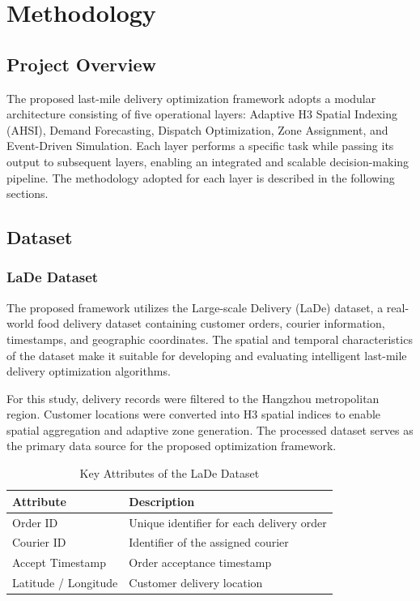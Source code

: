 \documentclass{article}
\begin{document}
\newpage
\section{Methodology}
\label{sec:methodology}

\subsection{Project Overview}
\label{subsec:project_overview}

The proposed last-mile delivery optimization framework adopts a modular architecture consisting of five operational layers: Adaptive H3 Spatial Indexing (AHSI), Demand Forecasting, Dispatch Optimization, Zone Assignment, and Event-Driven Simulation. Each layer performs a specific task while passing its output to subsequent layers, enabling an integrated and scalable decision-making pipeline. The methodology adopted for each layer is described in the following sections.

\subsection{Dataset}
\label{subsec:dataset}

\subsubsection{LaDe Dataset}
\label{subsubsec:lade_dataset}

The proposed framework utilizes the Large-scale Delivery (LaDe) dataset, a real-world food delivery dataset containing customer orders, courier information, timestamps, and geographic coordinates. The spatial and temporal characteristics of the dataset make it suitable for developing and evaluating intelligent last-mile delivery optimization algorithms.

For this study, delivery records were filtered to the Hangzhou metropolitan region. Customer locations were converted into H3 spatial indices to enable spatial aggregation and adaptive zone generation. The processed dataset serves as the primary data source for the proposed optimization framework.

\begin{table}[htbp]
\centering
\caption{Key Attributes of the LaDe Dataset}
\label{tab:lade_attributes}
\begin{tabular}{ll}
\hline
\textbf{Attribute} & \textbf{Description} \\
\hline
Order ID & Unique identifier for each delivery order \\
Courier ID & Identifier of the assigned courier \\
Accept Timestamp & Order acceptance timestamp \\
Latitude / Longitude & Customer delivery location \\
\hline
\end{tabular}
\end{table}
\end{document}
